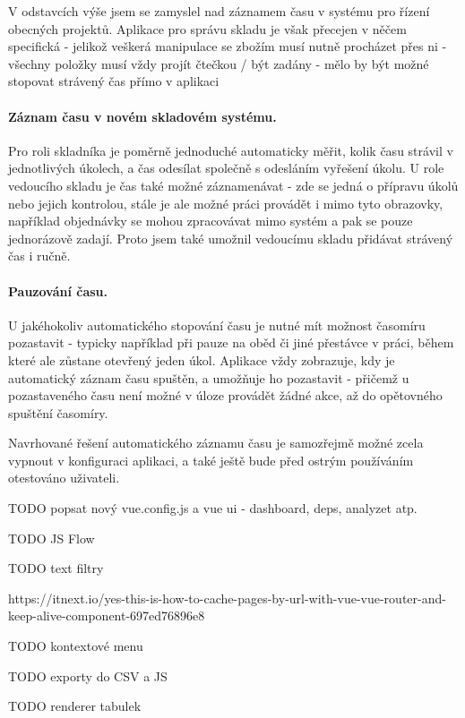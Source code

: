 V odstavcích výše jsem se zamyslel nad záznamem času v systému pro řízení obecných projektů. Aplikace pro správu skladu je však přecejen v něčem specifická - jelikož veškerá manipulace se zbožím musí nutně procházet přes ni - všechny položky musí vždy projít čtečkou / být zadány - mělo by být možné stopovat strávený čas přímo v aplikaci

\paragraph{Záznam času v novém skladovém systému.} Pro roli skladníka je poměrně jednoduché automaticky měřit, kolik času strávil v jednotlivých úkolech, a čas odesílat společně s odesláním vyřešení úkolu. U role vedoucího skladu je čas také možné záznamenávat - zde se jedná o přípravu úkolů nebo jejich kontrolou, stále je ale možné práci provádět i mimo tyto obrazovky, například objednávky se mohou zpracovávat mimo systém a pak se pouze jednorázově zadají. Proto jsem také umožnil vedoucímu skladu přidávat strávený čas i ručně.

\paragraph{Pauzování času.} U jakéhokoliv automatického stopování času je nutné mít možnost časomíru pozastavit - typicky například při pauze na oběd či jiné přestávce v práci, během které ale zůstane otevřený jeden úkol. Aplikace vždy zobrazuje, kdy je automatický záznam času spuštěn, a umožňuje ho pozastavit - přičemž u pozastaveného času není možné v úloze provádět žádné akce, až do opětovného spuštění časomíry.

Navrhované řešení automatického záznamu času je samozřejmě možné zcela vypnout v konfiguraci aplikaci, a také ještě bude před ostrým používáním otestováno uživateli. 


TODO popsat nový vue.config.js a vue ui - dashboard, deps, analyzet atp.

TODO JS Flow

TODO text filtry

https://itnext.io/yes-this-is-how-to-cache-pages-by-url-with-vue-vue-router-and-keep-alive-component-697ed76896e8

TODO kontextové menu

TODO exporty do CSV a JS

TODO renderer tabulek

